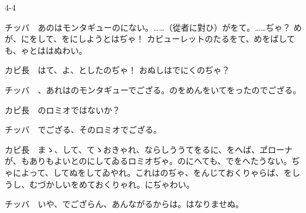 \documentclass[tate,paper=b6j,jafontsize=9pt]{jlreq}
\begin{document}
\begin{azconvIndented}{4\zw}{-4\zw}

チッバ　あのはモンタギューのにない。……（從者に對ひ）がをて。……ぢゃ？ めが、にをして、をにしようとはぢゃ！ カピューレットのたるをて、めをばしても、ゃとははぬわい。

カピ長　はて、よ、としたのぢゃ！ おぬしはでにくのぢゃ？

チッバ　、あれはのモンタギューでござる。のをめんをいてをったのでござる。

カピ長　のロミオではないか？

チッバ　でござる、そのロミオでござる。

カピ長　まゝ、して、てゝおきゃれ、ならしううてをるに、をへば、ヹローナが、もありもよいとのにしてゐるロミオぢゃ。のにへても、でをへたうない。ぢゃによって、してぬをしてゐやれ。これはのぢゃ、をんじておくりゃらば、をしうし、むづかしいをめておくりゃれ。にぢゃわい。

チッバ　いや、でござらん、あんながるからは。はなりませぬ。


\end{azconvIndented}
\end{document}

